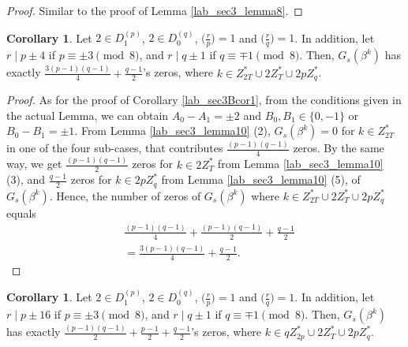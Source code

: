 \documentclass{mcom-l}
\theoremstyle{definition}
\newtheorem{sec3Ccor1}[sec3Bcor1]{Corollary}
\newtheorem{sec3Ccor2}[sec3Bcor1]{Corollary}
\numberwithin{equation}{section}
\begin{document}
    \begin{proof}
    Similar to the proof of Lemma \ref{lab_sec3_lemma8}.
    \end{proof} 
    \begin{sec3Ccor1}\label{lab_sec3Ccor1}
    Let $ 2\in D_{1}^{(p)} $, $ 2\in D_{0}^{(q)} $, $ \bigl(\tfrac{r}{p}\bigr) =1$ and $ \bigl(\tfrac{r}{q}\bigr) =1$. In addition, let  $ r\mid p\pm 4 $ if $ p\equiv\pm 3\pmod 8 $, and $ r\mid q\pm 1 $ if $ q\equiv\mp 1\pmod 8 $. Then, $ G_{s}(\beta^{k}) $ has exactly $ \tfrac{3(p-1)(q-1)}{4}+\tfrac{q-1}{2} $'s zeros, where $ k\in Z_{2T}^{*}\cup 2Z_{T}^{*}\cup 2pZ_{q}^{*} $.
    \end{sec3Ccor1}
    \begin{proof}
      As for the proof of Corollary \ref{lab_sec3Bcor1}, from the conditions given in the actual Lemma, we can obtain $ A_{0}-A_{1}=\pm 2 $ and $ B_{0},B_{1}\in \lbrace 0,-1\rbrace $ or $B_{0}-B_{1}=\pm 1  $. From Lemma \ref{lab_sec3_lemma10} (2), $ G_{s}(\beta^{k})=0 $ for $ k\in Z_{2T}^{*} $ in one of the four sub-cases, that contributes $ \tfrac{(p-1)(q-1)}{4} $ zeros. By the same way, we get $ \tfrac{(p-1)(q-1)}{2} $ zeros for $ k\in 2Z_{T}^{*} $ from Lemma \ref{lab_sec3_lemma10} (3), and $ \tfrac{q-1}{2} $ zeros for $ k\in 2pZ_{q}^{*} $ from Lemma \ref{lab_sec3_lemma10} (5), of $ G_{s}(\beta^{k}) $. Hence, the number of zeros of $ G_{s}(\beta^{k}) $ where $ k\in Z_{2T}^{*}\cup 2Z_{T}^{*}\cup 2pZ_{q}^{*} $ equals 
      \begin{equation*}
      \begin{split}   
      &\frac{(p-1)(q-1)}{4}+\frac{(p-1)(q-1)}{2}+\frac{q-1}{2}\\
      &=\frac{3(p-1)(q-1)}{4}+\frac{q-1}{2}.
      \end{split}
      \end{equation*}
    \end{proof} 
    \begin{sec3Ccor2}\label{lab_sec3Ccor2}
       Let $ 2\in D_{1}^{(p)} $, $ 2\in D_{0}^{(q)} $, $ \bigl(\tfrac{r}{p}\bigr) =1$ and $ \bigl(\tfrac{r}{q}\bigr) =1$. In addition, let  $ r\mid p\pm 16 $ if $ p\equiv\pm 3\pmod 8 $, and $ r\mid q\pm 1 $ if $ q\equiv\mp 1\pmod 8 $. Then, $ G_{s}(\beta^{k}) $ has exactly $ \tfrac{(p-1)(q-1)}{2}+\tfrac{p-1}{2}+\tfrac{q-1}{2} $'s zeros, where $ k\in qZ_{2p}^{*}\cup 2Z_{T}^{*}\cup 2pZ_{q}^{*} $.
    \end{sec3Ccor2}
\end{document}
